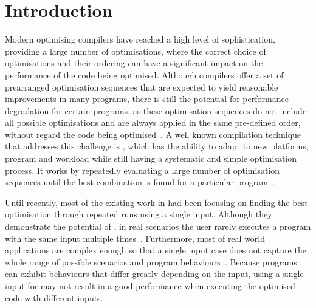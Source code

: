 \section{Introduction}
Modern optimising compilers have reached a high level of sophistication,
providing a large number of optimisations, where the correct choice of
optimisations and their ordering can have a significant impact on the
performance of the code being optimised.
Although compilers offer a set of prearranged optimisation sequences that are
expected to yield reasonable improvements in many programs, there is still the
potential for performance degradation for certain programs, as these
optimisation sequences do not include all possible optimisations and are always
applied in the same pre-defined order, without regard the code being
optimised~\cite{pan06,cavazos07,zhou12,kulkarni12}.
A well known compilation technique that addresses this challenge is {\itercomp},
which has the ability to adapt to new platforms, program and workload while
still having a systematic and simple optimisation process.
It works by repeatedly evaluating a large number of optimisation sequences until
the best combination is found for a particular
program~\cite{kisuki99,fursin07,chen10}.




Until recently, most of the existing work in {\itercomp} had been focusing on
finding the best optimisation through repeated runs using a single input.
Although they demonstrate the potential of {\itercomp}, in real scenarios the
user rarely executes a program with the same input multiple
times~\cite{bodin98,kisuki99,stephenson03,kulkarni04,agakov06}.
Furthermore, most of real world applications are complex enough so that a single
input case does not capture the whole range of possible scenarios and program
behaviours~\cite{haneda06,fursin07,chen10,chen12a}.
Because programs can exhibit behaviours that differ greatly depending on the
input, using a single input for {\itercomp} may not result in a good performance
when executing the optimised code with different inputs.

